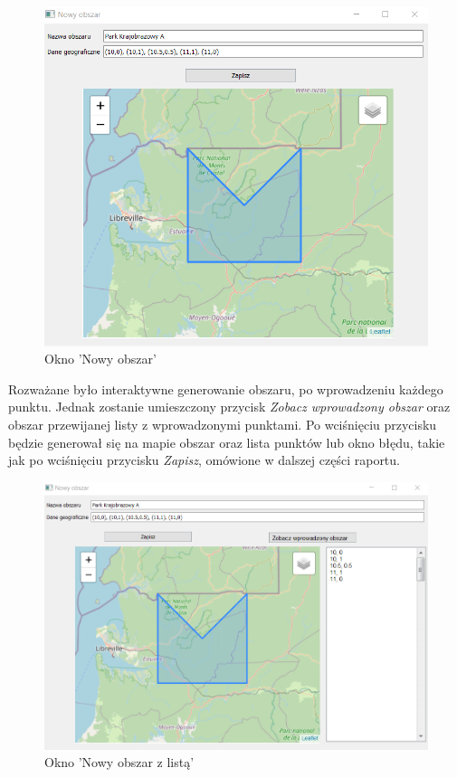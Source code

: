 \documentclass{article}
\begin{document}
 \begin{figure}[h] 
\begin{center}
\includegraphics[scale = 1]{"NowyObszar.png"}
\end{center}
\caption{Okno 'Nowy obszar'}
\label{}
\end{figure}

 \newpage Rozważane było interaktywne generowanie obszaru, po wprowadzeniu każdego punktu. Jednak zostanie umieszczony przycisk \textit{Zobacz wprowadzony obszar} oraz obszar przewijanej listy z wprowadzonymi punktami. Po wciśnięciu przycisku będzie generował się na mapie obszar oraz lista punktów lub okno błędu, takie jak po wciśnięciu przycisku \textit{Zapisz}, omówione w dalszej części raportu.
 
 \begin{figure}[h] 
\begin{center}
\includegraphics[scale = 0.8]{"NowyObszarZLista.png"}
\end{center}
\caption{Okno 'Nowy obszar z listą'}
\label{}
\end{figure}
\end{document}
